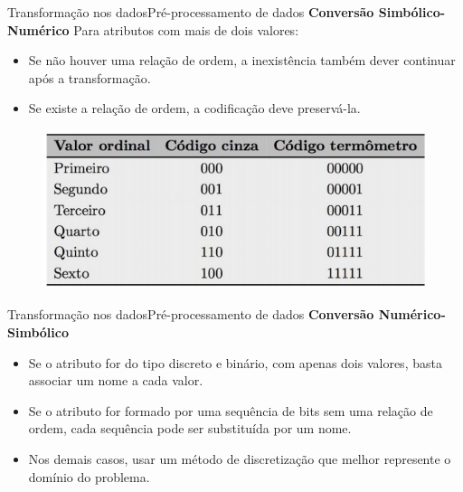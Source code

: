 \documentclass[t]{beamer}
\begin{document}

\begin{ftst}{Transformação nos dados}{Pré-processamento de dados}
\justifying
\textbf{Conversão Simbólico-Numérico}
\vone
Para atributos com mais de dois valores:
\vone
\begin{itemize}
    \item Se não houver uma relação de ordem, a inexistência também dever continuar após a transformação.
    \item Se existe a relação de ordem, a codificação deve preservá-la.
\end{itemize}

\begin{figure}
    \centering
    \includegraphics[scale=0.6]{Figuras/slide02_03.jpg}
\end{figure}

\end{ftst}


\begin{ftst}{Transformação nos dados}{Pré-processamento de dados}
\justifying
\textbf{Conversão Numérico-Simbólico}
\vone

\begin{itemize}
    \item Se o atributo for do tipo discreto e binário, com apenas dois valores, basta associar um nome a cada valor.
    \item Se o atributo for formado por uma sequência de bits sem uma relação de ordem, cada sequência pode ser substituída por um nome.
    \item Nos demais casos, usar um método de discretização que melhor represente o domínio do problema.
\end{itemize}

\end{ftst}

\end{document}
